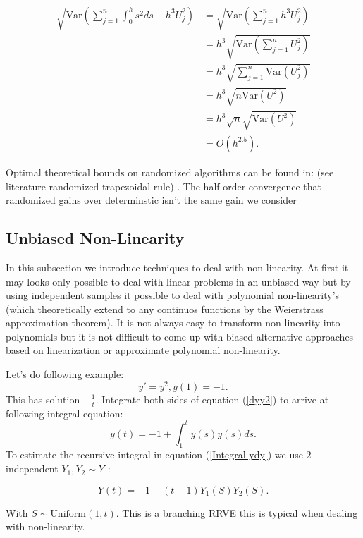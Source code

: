 \documentclass[a4paper,12pt]{article}
\begin{document}
\begin{align*}
    \sqrt{\text{Var}\left(\sum_{j=1}^{n} \int_{0}^{h} s^{2}ds- h^{3}U_{j}^{2}\right)}
     & =\sqrt{\text{Var}\left(\sum_{j=1}^{n} h^{3}U_{j}^{2}\right)}   \\
     & =h^{3} \sqrt{\text{Var}\left( \sum_{j=1}^{n} U_{j}^{2}\right)} \\
     & =h^{3} \sqrt{ \sum_{j=1}^{n}\text{Var} (U_{j}^{2})}            \\
     & =h^{3} \sqrt{ n \text{Var}(U^{2})}                             \\
     & =h^{3} \sqrt{n} \sqrt{ \text{Var}(U^{2})}                      \\
     & = O(h^{2.5}).
\end{align*}


\begin{related}
    Optimal theoretical bounds on randomized algorithms can be found in:
    (see literature randomized trapezoidal rule)
    \cite{wu_randomised_2020}. The half order convergence that randomized
    gains over determinstic isn't the same gain we consider
\end{related}

\subsection{Unbiased Non-Linearity}
In this subsection we introduce techniques to deal with non-linearity.
At first it may looks only possible to deal with linear problems in an unbiased way but by using
independent samples it possible to deal with polynomial non-linearity's (which theoretically extend
to any continuos functions by the Weierstrass approximation theorem).  It is not always easy to
transform non-linearity into polynomials but it is not difficult to come up with
biased alternative approaches based on linearization or approximate polynomial non-linearity.


\begin{example}[$y'=y^{2}$]
    Let's do following example:
    \begin{equation} \label{dyy2}
        y'= y^2,y(1)=-1.
    \end{equation}
    This has solution $-\frac{1}{t}$. Integrate both sides of
    equation (\ref{dyy2}) to arrive at following integral equation:
    \begin{equation} \label{Integral dyy2}
        y(t) = -1 + \int_{1}^{t} y(s) y(s) ds .
    \end{equation}
    To estimate the recursive integral in equation (\ref{Integral ydy}) we use $2$
    independent $Y_{1},Y_{2}\sim Y$ :

    \begin{equation} \label{RRVE yy2}
        Y(t) = -1 + (t-1) Y_{1}(S) Y_{2}(S).
    \end{equation}

    With $S \sim \text{Uniform}(1,t)$. This is a branching RRVE this is
    typical when dealing with non-linearity.
\end{example}
\end{document}
